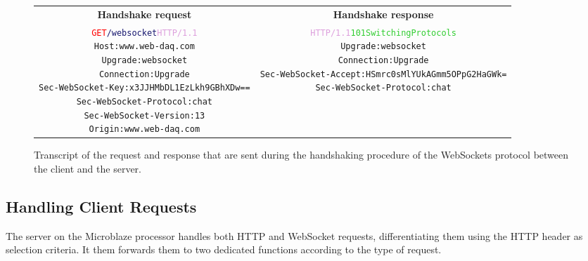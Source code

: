       \begin{figure}[h!]
        \begin{tabularx}{\textwidth}{C{1}C{1}}
          \textbf{Handshake  request} & \textbf{Handshake response} \\
        { \footnotesize
\begin{alltt}
\textcolor{Red}{GET} \textcolor{MidnightBlue}{/websocket} \textcolor{Plum}{HTTP/1.1} \newline
\textcolor{BurntOrange}{Host:} www.web-daq.com \newline
\textcolor{BurntOrange}{Upgrade:} websocket \newline
\textcolor{BurntOrange}{Connection:} Upgrade \newline
\textcolor{BurntOrange}{Sec-WebSocket-Key:} x3JJHMbDL1EzLkh9GBhXDw== \newline
\textcolor{BurntOrange}{Sec-WebSocket-Protocol:} chat \newline
\textcolor{BurntOrange}{Sec-WebSocket-Version:} 13 \newline
\textcolor{BurntOrange}{Origin:} www.web-daq.com
\end{alltt} } & { \footnotesize
\begin{alltt}
\textcolor{Plum}{HTTP/1.1} \textcolor{LimeGreen}{101 Switching Protocols} \newline
\textcolor{BurntOrange}{Upgrade:} websocket \newline
\textcolor{BurntOrange}{Connection:} Upgrade \newline
\textcolor{BurntOrange}{Sec-WebSocket-Accept:} HSmrc0sMlYUkAGmm5OPpG2HaGWk= \newline
\textcolor{BurntOrange}{Sec-WebSocket-Protocol:} chat
\end{alltt} }
        \end{tabularx}
        \caption{Transcript of the request and response that are sent during the handshaking procedure of the WebSockets protocol between the client and the server.}
        \label{fig:III-2-websocket}
      \end{figure}

    \subsection{Handling Client Requests}

      The server on the Microblaze processor handles both HTTP and WebSocket requests, differentiating them using the HTTP header as selection criteria. It them forwards them to two dedicated functions according to the type of request. \\

